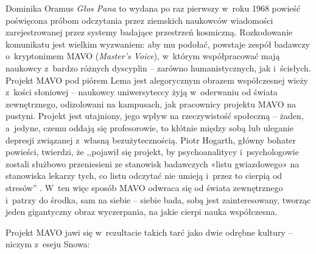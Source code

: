 \begin{artplenv}{Dominika Oramus}
\textit{Głos Pana}
\parencite[][]{lem_glos_2002} %
 to wydana po raz pierwszy w~roku 1968 powieść poświęcona próbom odczytania przez ziemskich naukowców wiadomości zarejestrowanej przez systemy badające przestrzeń kosmiczną. Rozkodowanie komunikatu jest wielkim wyzwaniem: aby mu podołać, powstaje zespół badawczy o~kryptonimem MAVO (\textit{Master’s Voice}), w~którym współpracować mają naukowcy z~bardzo różnych dyscyplin -- zarówno humanistycznych, jak i~ścisłych. Projekt MAVO pod piórem Lema jest alegorycznym obrazem współczesnej wieży z~kości słoniowej -- naukowcy uniwersyteccy żyją w~oderwaniu od świata zewnętrznego, odizolowani na kampusach, jak pracownicy projektu MAVO na pustyni. Projekt jest utajniony, jego wpływ na rzeczywistość społeczną -- żaden, a~jedyne, czemu oddają się profesorowie, to kłótnie między sobą lub uleganie depresji związanej z~własną bezużytecznością. Piotr Hogarth, główny bohater powieści, twierdzi, że ,,pojawił się projekt, by psychoanalitycy i~psychologowie zostali służbowo przeniesieni ze stanowisk badawczych «listu gwiazdowego» na stanowiska lekarzy tych, co listu odczytać nie umieją i~przez to cierpią od stresów'' 
\parencite[][s.~85]{lem_glos_2002}. %
 W~ten więc sposób MAVO odwraca się od świata zewnętrznego i~patrzy do środka, sam na siebie -- siebie bada, sobą jest zainteresowany, tworząc jeden gigantyczny obraz wyczerpania, na jakie cierpi nauka współczesna.

Projekt MAVO jawi się w~rezultacie takich tarć jako dwie odrębne kultury -- niczym z~eseju Snowa:



\end{artplenv}
